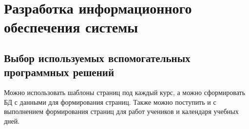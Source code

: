 \section{Разработка информационного обеспечения системы}

\subsection{Выбор используемых вспомогательных программных решений}






Можно использовать шаблоны страниц под каждый курс, а можно сформировать БД с данными для формирования страниц.
Также можно поступить и с выполнением формирования страниц для работ учеников и календаря учебных дней.






\clearpage

